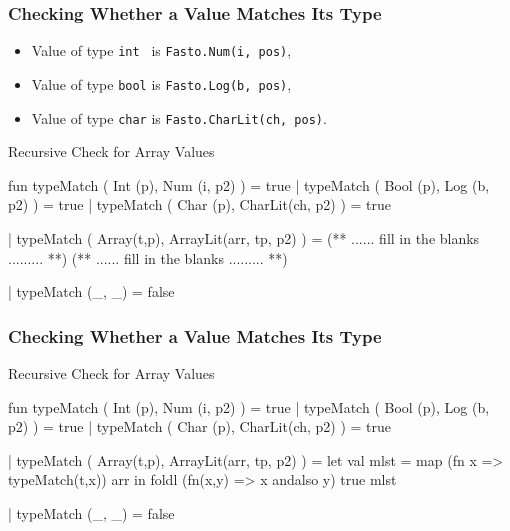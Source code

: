\documentclass{beamer}
\newcommand{\emp}[1]{\textcolor{DikuRed}{ #1}}
\begin{document}
\begin{frame}[fragile, t]
\frametitle{Checking Whether a Value Matches Its Type}

\smallskip

\begin{itemize}
    \item Value of type {\tt int~} is {\tt Fasto.Num(i, pos)},
    \item Value of type {\tt bool} is {\tt Fasto.Log(b, pos)},
    \item Value of type {\tt char} is {\tt Fasto.CharLit(ch, pos)}.
\end{itemize}

\bigskip

\begin{block}{Recursive Check for Array Values}
\begin{colorcode}[fontsize=\scriptsize]
fun typeMatch ( Int  (p), Num    (i,  p2) ) = true
  | typeMatch ( Bool (p), Log    (b,  p2) ) = true
  | typeMatch ( Char (p), CharLit(ch, p2) ) = true

  | typeMatch ( Array(t,p), ArrayLit(arr, tp, p2) ) = 
      (** ...... fill in the blanks ......... **)
      (** ...... fill in the blanks ......... **)

  | typeMatch (_, _) = false
\end{colorcode} 
\end{block}

\end{frame}



\begin{frame}[fragile, t]
\frametitle{Checking Whether a Value Matches Its Type}

\begin{block}{Recursive Check for Array Values}
\begin{colorcode}[fontsize=\scriptsize]
fun typeMatch ( Int  (p), Num    (i,  p2) ) = true
  | typeMatch ( Bool (p), Log    (b,  p2) ) = true
  | typeMatch ( Char (p), CharLit(ch, p2) ) = true

  | typeMatch ( Array(t,p), ArrayLit(arr, tp, p2) ) = 
      let val mlst = \emp{map (fn x => typeMatch(t,x)) arr}
      in  foldl (fn(x,y) => x andalso y) true mlst

  | typeMatch (_, _) = false
\end{colorcode} 
\end{block}

\end{frame}
\end{document}
